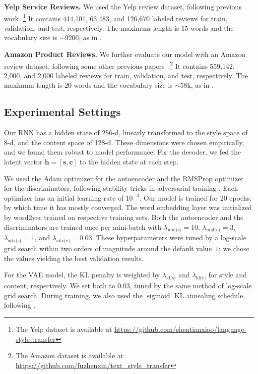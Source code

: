 \documentclass[11pt,a4paper]{article}
\newcommand{\hyp}[1]{\lambda_{\text{#1}}}
\begin{document}
\textbf{Yelp Service Reviews.}
We used the Yelp review dataset, following previous work \cite{shen2017style,zhao2018adversarially}.\footnote{The Yelp dataset is available at \url{https://github.com/shentianxiao/language-style-transfer}}
It contains 444,101, 63,483, and 126,670 labeled reviews for train, validation, and test, respectively.
The maximum length is 15 words and the vocabulary size is $\sim$9200, as in \citet{shen2017style}.

\textbf{Amazon Product Reviews.}
We further evaluate our model with an Amazon review dataset, following some other previous papers~\cite{fu2018style}.\footnote{The Amazon dataset is available at \url{https://github.com/fuzhenxin/text_style_transfer}}
It contains 559,142, 2,000, and 2,000 labeled reviews for train, validation, and test, respectively.
The maximum length is 20 words and the vocabulary size is $\sim$58k, as in \citet{fu2018style}.


\subsection{Experimental Settings}

Our RNN has a hidden state of 256-d, linearly transformed to the style space of 8-d, and the content space of 128-d. These dimensions were chosen empirically, and we found them robust to model performance.
For the decoder, we fed the latent vector $\bm h=[\bm s, \bm c]$ to the hidden state at each step.

We used the Adam optimizer \cite{kingma2014adam} for the autoencoder and the RMSProp optimizer \cite{tieleman2012lecture} for the discriminators, following stability tricks in adversarial training  \cite{arjovsky2017wasserstein}.
Each optimizer has an initial learning rate of $10^{-3}$.
Our model is trained for 20 epochs, by which time it has mostly converged.
The word embedding layer was initialized by word2vec \cite{mikolov2013distributed} trained on respective training sets.
Both the autoencoder and the discriminators are trained once per mini-batch with $\hyp{mul(s)}\!\!=\!\!10$, $\hyp{mul(c)}\!\!=\!\!3$, $\hyp{adv(s)}\!\!=\!\!1$, and $\hyp{adv(c)} = 0.03$.
These hyperparameters were tuned by a log-scale grid search within two orders of magnitude around the default value~$1$; we chose the values yielding the best validation results.

For the VAE model, the KL penalty is weighted by $\hyp{kl(s)}$ and $\hyp{kl(c)}$ for style and content, respectively.
We set both to $0.03$, tuned by the same method of log-scale grid search. During training, we also used the $\operatorname{sigmoid}$ KL annealing schedule, following \citet{bahuleyan2017variational}.
\end{document}
